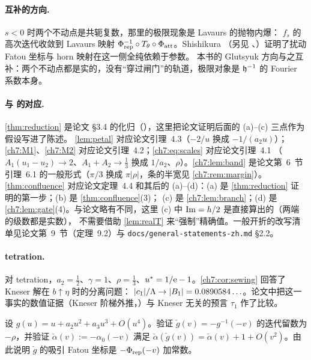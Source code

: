 \paragraph{互补的方向.}
$s<0$ 时两个不动点是共轭复数，那里的极限现象是 Lavaurs \cite{Lavaurs1989} 的抛物内爆：
$f_s$ 的高次迭代收敛到 Lavaurs 映射 $\Phi_{\mathrm{rep}}^{-1}\circ T_\theta\circ\Phi_{\mathrm{att}}$。Shishikura \cite{Shishikura2000}
（另见 \cite{InouShishikura}、\cite{Oudkerk1999}）证明了扰动 Fatou 坐标与 horn 映射在这一侧全纯依赖于参数。
本书的 Glutsyuk 方向与之互补：两个不动点都是实的，没有``穿过闸门''的轨道，极限对象是 $\mathfrak h^{-1}$ 的 Fourier 系数本身。

\paragraph{与 \cite{KneserPaper} 的对应.}
\cref{thm:reduction} 是论文 §3.4 的化归（\cite[定理~3.6]{KneserPaper}），这里把论文证明后面的 (a)--(c) 三点作为假设写进了陈述。
\cref{lem:petal} 对应论文引理~4.3（$-2/u$ 换成 $-1/(a_2u)$）；\ref{ch7:M1}、\ref{ch7:M2} 对应论文引理~4.2；\eqref{ch7:eq:scales} 对应论文引理~4.1
（$A_1(u_1-u_2)\to2$、$A_1+A_2\to\frac13$ 换成 $1/a_2$、$\rho$）。\cref{ch7:lem:band} 是论文第~6~节引理~6.1 的一般形式（$\pi/3$ 换成 $\pi|\rho|$，条的半宽见 \cref{ch7:rem:margin}）。
\cref{thm:confluence} 对应论文定理~4.4 和其后的 (a)--(d)：(a) 是 \cref{thm:reduction} 证明的第一步；(b) 是 \cref{thm:confluence}(3)；
(c) 是 \cref{ch7:lem:branch}；(d) 是 \cref{ch7:lem:gate}(4)。与论文略有不同，这里 (c) 中 $\operatorname{Im}=h/2$ 是直接算出的（两端的级数都是实数），
不需要借助 \cref{lem:realT} 来``强制''精确值。一般开折的改写清单见论文第~9~节（定理~9.2）与 \texttt{docs/general-statements-zh.md} §2.2。

\paragraph{tetration.}
对 tetration，$a_2=\frac12$、$\gamma=1$、$\rho=\frac13$、$u^{*}=1/\mathrm{e}-1$。\cref{ch7:cor:sewing} 回答了 Kneser 解在 $b\uparrow\eta$ 时的分离问题：
$|c_1|/\Lambda\to|B_1|=0.0890584\ldots$。论文中把这一事实的数值证据（Kneser 阶梯外推，\cite[表~3]{KneserPaper}）与 Kneser 无关的预言 $\tau_1$ 作了比较。

\exercises

\begin{exercise}\label{ch7:ex:reflected}
设 $g(u)=u+a_2u^2+a_3u^3+O(u^4)$。验证 $\check g(v)=-g^{-1}(-v)$ 的迭代留数为 $-\rho$，并验证
$\check\alpha(v):=-\alpha_0(-v)$ 满足 $\check\alpha(\check g(v))=\check\alpha(v)+1+O(v^2)$。由此说明
$\check g$ 的吸引 Fatou 坐标是 $-\Phi_{\mathrm{rep}}(-v)$ 加常数。
\end{exercise}

